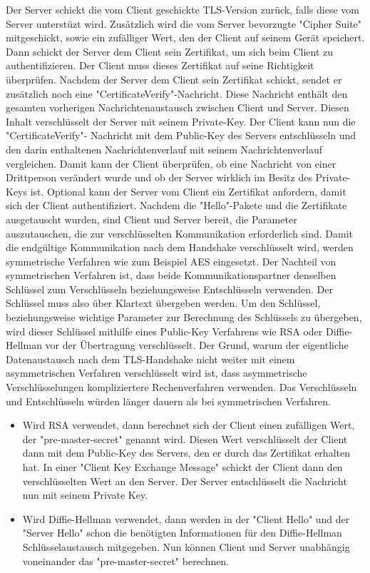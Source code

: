 Der Server schickt die vom Client geschickte TLS-Version zurück, falls diese vom Server unterstüzt wird. Zusätzlich wird die vom Server bevorzugte "Cipher Suite" mitgeschickt, sowie ein zufälliger Wert, den der Client auf seinem Gerät speichert. Dann schickt der Server dem Client sein Zertifikat, um sich beim Client zu authentifizieren. Der Client muss dieses Zertifikat auf seine Richtigkeit überprüfen. Nachdem der Server dem Client sein Zertifikat schickt, sendet er zusätzlich noch eine "CertificateVerify"-Nachricht. Diese Nachricht enthält den gesamten vorherigen Nachrichtenaustausch zwischen Client und Server. Diesen Inhalt verschlüsselt der Server mit seinem Private-Key. Der Client kann nun die "CertificateVerify"- Nachricht mit dem Public-Key des Servers entschlüsseln und den darin enthaltenen Nachrichtenverlauf mit seinem Nachrichtenverlauf vergleichen. Damit kann der Client überprüfen, ob eine Nachricht von einer Drittperson verändert wurde und ob der Server wirklich im Besitz des Private-Keys ist. Optional kann der Server vom Client ein Zertifikat anfordern, damit sich der Client authentifiziert. 
Nachdem die "Hello"-Pakete und die Zertifikate ausgetauscht wurden, sind Client und Server bereit, die Parameter auszutauschen, die zur verschlüsselten Kommunikation erforderlich sind. Damit die endgültige Kommunikation nach dem Handshake verschlüsselt wird, werden symmetrische Verfahren wie zum Beispiel AES eingesetzt. Der Nachteil von symmetrischen Verfahren ist, dass beide Kommunikationspartner denselben Schlüssel zum Verschlüsseln beziehungsweise Entschlüsseln verwenden. Der Schlüssel muss also über Klartext übergeben werden. Um den Schlüssel, beziehungsweise wichtige Parameter zur Berechnung des Schlüssels zu übergeben, wird dieser Schlüssel mithilfe eines Public-Key Verfahrens wie RSA oder Diffie-Hellman vor der Übertragung verschlüsselt. Der Grund, warum der eigentliche Datenaustausch nach dem TLS-Handshake nicht weiter mit einem asymmetrischen Verfahren verschlüsselt wird ist, dass asymmetrische Verschlüsselungen kompliziertere Rechenverfahren verwenden. Das Verschlüsseln und Entschlüsseln würden länger dauern als bei symmetrischen Verfahren. \cite{WikiTLS}

\begin{itemize}
    \item Wird RSA verwendet, dann berechnet sich der Client einen zufälligen Wert, der "pre-master-secret" genannt wird. Diesen Wert verschlüsselt der Client dann mit dem Public-Key des Servers, den er durch das Zertifikat erhalten hat. In einer "Client Key Exchange Message" schickt der Client dann den verschlüsselten Wert an den Server. Der Server entschlüsselt die Nachricht nun mit seinem Private Key.
    \item Wird Diffie-Hellman verwendet, dann werden in der "Client Hello" und der "Server Hello" schon die benötigten Informationen für den Diffie-Hellman Schlüsselaustausch mitgegeben. Nun können Client und Server unabhängig voneinander das "pre-master-secret" berechnen.
\end{itemize}

